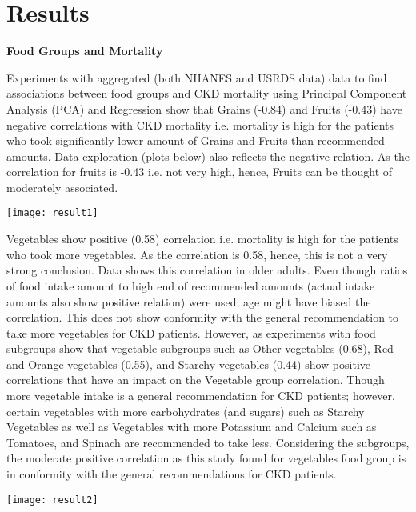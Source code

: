 \newcommand{\specialcell}[2][c]{%
\begin{tabular}[#1]{@{}c@{}}#2\end{tabular}}

\section{Results}
\noindent \textbf{Food Groups and Mortality}

\noindent Experiments with aggregated (both NHANES and USRDS data) data to find associations between food groups and CKD mortality using Principal Component Analysis (PCA) and Regression show that Grains (-0.84) and Fruits (-0.43) have negative correlations with CKD mortality i.e. mortality is high for the patients who took significantly lower amount of Grains and Fruits than recommended amounts. Data exploration (plots below) also reflects the negative relation. As the correlation for fruits is -0.43 i.e. not very high, hence, Fruits can be thought of moderately associated.

\medskip 
\texttt{[image: result1]}
\medskip 

\noindent Vegetables show positive (0.58) correlation i.e. mortality is high for the patients who took more vegetables. As the correlation is 0.58, hence, this is not a very strong conclusion. Data shows this correlation in older adults. Even though ratios of food intake amount to high end of recommended amounts (actual intake amounts also show positive relation) were used; age might have biased the correlation. This does not show conformity with the general recommendation to take more vegetables for CKD patients. However, as experiments with food subgroups show that vegetable subgroups such as Other vegetables (0.68), Red and Orange vegetables (0.55), and Starchy vegetables (0.44) show positive correlations that have an impact on the Vegetable group correlation.  Though more vegetable intake is a general recommendation for CKD patients; however, certain vegetables with more carbohydrates (and sugars) such as Starchy Vegetables as well as Vegetables with more Potassium and Calcium such as Tomatoes, and Spinach are recommended to take less. Considering the subgroups, the moderate positive correlation as this study found for vegetables food group is in conformity with the general recommendations for CKD patients.

\medskip 
\texttt{[image: result2]}
\medskip 

